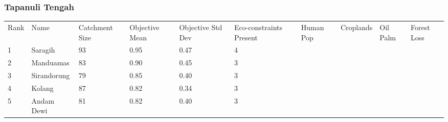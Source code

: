 \subsubsection{Tapanuli Tengah}
\begin{table}[ht]
\centering
\begingroup\fontsize{8pt}{9pt}\selectfont
\begin{tabular}{C{0.03\textwidth}C{0.12\textwidth}C{0.09\textwidth}C{0.08\textwidth}C{0.08\textwidth}C{0.08\textwidth}C{0.07\textwidth}C{0.07\textwidth}C{0.07\textwidth}C{0.07\textwidth}}
 Rank & Name & Catchment Size & Objective Mean & Objective Std Dev & Eco-constraints  Present & Human Pop & Croplands & Oil Palm & Forest Loss \\ 
 {1} & Saragih &  93 & \textcolor[HTML]{FFFFFF}{0.95} & \textcolor[HTML]{FFFFFF}{0.47} & \textcolor[HTML]{FFFFFF}{4} &  &  &  &  \\ 
  {2} & Manduamas &  83 & \textcolor[HTML]{FFFFFF}{0.90} & \textcolor[HTML]{FFFFFF}{0.45} & \textcolor[HTML]{000000}{3} &  &  &  &  \\ 
  {3} & Sirandorung &  79 & \textcolor[HTML]{000000}{0.85} & \textcolor[HTML]{000000}{0.40} & \textcolor[HTML]{000000}{3} &  &  &  &  \\ 
  {4} & Kolang &  87 & \textcolor[HTML]{000000}{0.82} & \textcolor[HTML]{000000}{0.34} & \textcolor[HTML]{000000}{3} &  &  &  &  \\ 
  {5} & Andam Dewi &  81 & \textcolor[HTML]{000000}{0.82} & \textcolor[HTML]{000000}{0.40} & \textcolor[HTML]{000000}{3} &  &  &  &  \\ 

\end{tabular}
\end{table}
